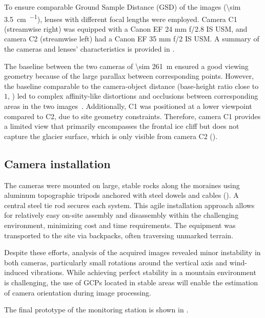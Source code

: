 To ensure comparable Ground Sample Distance (GSD) of the images (\SI{\sim 3.5}{\centi\meter\per\pixel}), lenses with different focal lengths were employed. 
Camera C1 (streamwise right) was equipped with a Canon EF 24 mm f/2.8 IS USM, and camera C2 (streamwise left) had a Canon EF 35 mm f/2 IS USM.
A summary of the cameras and lenses' characteristics is provided in .

The baseline between the two cameras of \SI{\sim 261}{\meter} ensured a good viewing geometry because of the large parallax between corresponding points.
However, the baseline comparable to the camera-object distance (base-height ratio close to \(1\), ) led to complex affinity-like distortions and occlusions between corresponding areas in the two images~\citep{Yao_2021}.
Additionally, C1 was positioned at a lower viewpoint compared to C2, due to site geometry constraints.
Therefore, camera C1 provides a limited view that primarily encompasses the frontal ice cliff but does not capture the glacier surface, which is only visible from camera C2 ().

\subsection{Camera installation}\label{sec:4:cameramonumentation}
The cameras were mounted on large, stable rocks along the moraines using aluminum topographic tripods anchored with steel dowels and cables (). 
A central steel tie rod secures each system. 
This agile installation approach allows for relatively easy on-site assembly and disassembly within the challenging environment, minimizing cost and time requirements. 
The equipment was transported to the site via backpacks, often traversing unmarked terrain.

Despite these efforts, analysis of the acquired images revealed minor instability in both cameras, particularly small rotations around the vertical axis and wind-induced vibrations. 
While achieving perfect stability in a mountain environment is challenging, the use of GCPs located in stable areas will enable the estimation of camera orientation during image processing.

The final prototype of the monitoring station is shown in .

